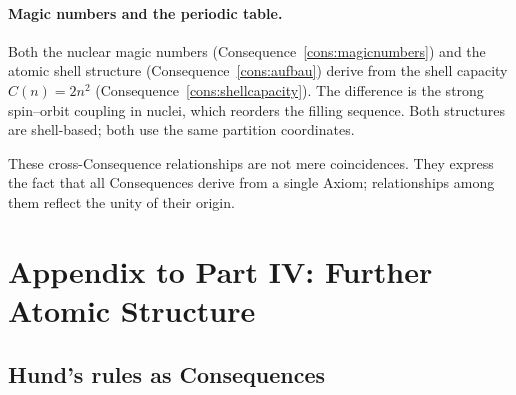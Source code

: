 \paragraph{Magic numbers and the periodic table.} Both the nuclear magic numbers (Consequence~\ref{cons:magicnumbers}) and the atomic shell structure (Consequence~\ref{cons:aufbau}) derive from the shell capacity $C(n)=2n^{2}$ (Consequence~\ref{cons:shellcapacity}). The difference is the strong spin--orbit coupling in nuclei, which reorders the filling sequence. Both structures are shell-based; both use the same partition coordinates.

These cross-Consequence relationships are not mere coincidences. They express the fact that all Consequences derive from a single Axiom; relationships among them reflect the unity of their origin.

\section*{Appendix to Part IV: Further Atomic Structure}

\subsection{Hund's rules as Consequences}

